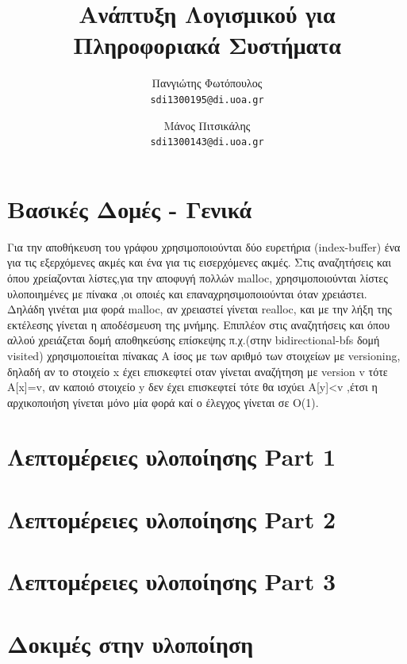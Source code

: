 \documentclass[12pt]{article}
\title{Ανάπτυξη Λογισμικού για Πληροφοριακά Συστήματα}
\author{Πανγιώτης Φωτόπουλος\\
  \texttt{sdi1300195@di.uoa.gr}
  \and Μάνος Πιτσικάλης\\
  \texttt{sdi1300143@di.uoa.gr}}
\date{}
\begin{document}
\maketitle


\section{Βασικές Δομές - Γενικά}
Για την αποθήκευση του γράφου χρησιμοποιούνται δύο ευρετήρια (index-buffer) ένα για τις εξερχόμενες ακμές και ένα για τις εισερχόμενες ακμές. Στις αναζητήσεις και όπου χρείαζονται λίστες,για την αποφυγή πολλών malloc, χρησιμοποιούνται λίστες υλοποιημένες με πίνακα ,οι οποιές και επαναχρησιμοποιούνται όταν χρειάστει. Δηλάδη γινέται μια φορά malloc, αν χρειαστεί γίνεται realloc, και με την λήξη της εκτέλεσης γίνεται η αποδέσμευση της μνήμης. Επιπλέον στις αναζητήσεις και όπου αλλού χρειάζεται δομή αποθηκεύσης επίσκεψης π.χ.(στην bidirectional-bfs δομή visited) χρησιμοποιείται πίνακας A ίσος με των αριθμό των στοιχείων με versioning, δηλαδή αν το στοιχείο x έχει επισκεφτεί οταν γίνεται αναζήτηση με version v τότε A[x]=v, αν καποιό στοιχείο y δεν έχει επισκεφτεί τότε θα ισχύει A[y]<v ,έτσι η αρχικοποιήση γίνεται μόνο μία φορά καί ο έλεγχος γίνεται σε O(1).
\section{Λεπτομέρειες υλοποίησης Part 1}
\section{Λεπτομέρειες υλοποίησης Part 2}
\section{Λεπτομέρειες υλοποίησης Part 3}
\section{Δοκιμές στην υλοποίηση}
\end{document}

